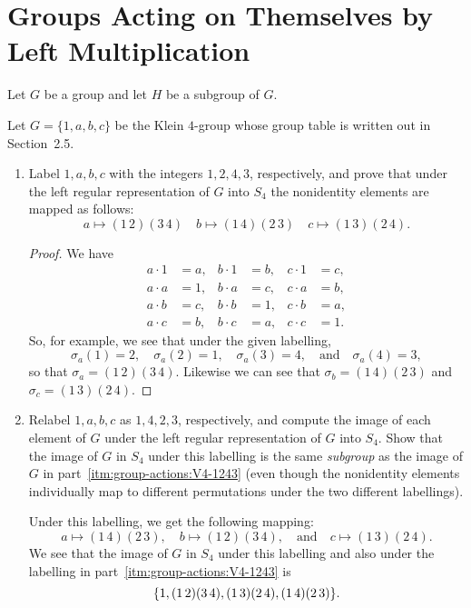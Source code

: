\section{Groups Acting on Themselves by Left Multiplication}

Let $G$ be a group and let $H$ be a subgroup of $G$.

 Let $G = \{1,a,b,c\}$ be the Klein $4$-group whose group
table is written out in Section~2.5.
\begin{enumerate}
\item \label{itm:group-actions:V4-1243}
  Label $1,a,b,c$ with the integers $1,2,4,3$, respectively, and prove
  that under the left regular representation of $G$ into $S_4$ the
  nonidentity elements are mapped as follows:
  \begin{equation*}
    a\mapsto(1\,2)(3\,4) \quad
    b\mapsto(1\,4)(2\,3) \quad
    c\mapsto(1\,3)(2\,4).
  \end{equation*}
  \begin{proof}
    We have
    \begin{align*}
      a\cdot1 &= a, & b\cdot1 &= b, & c\cdot1 &= c, \\
      a\cdot a &= 1, & b\cdot a &= c, & c\cdot a &= b, \\
      a\cdot b &= c, & b\cdot b &= 1, & c\cdot b &= a, \\
      a\cdot c &= b, & b\cdot c &= a, & c\cdot c &= 1.
    \end{align*}
    So, for example, we see that under the given labelling,
    \begin{equation*}
      \sigma_a(1) = 2, \quad
      \sigma_a(2) = 1, \quad
      \sigma_a(3) = 4, \quad\text{and}\quad
      \sigma_a(4) = 3,
    \end{equation*}
    so that $\sigma_a = (1\,2)(3\,4)$. Likewise we can see that
    $\sigma_b = (1\,4)(2\,3)$ and $\sigma_c = (1\,3)(2\,4)$.
  \end{proof}

\item Relabel $1,a,b,c$ as $1,4,2,3$, respectively, and compute the
  image of each element of $G$ under the left regular representation
  of $G$ into $S_4$. Show that the image of $G$ in $S_4$ under this
  labelling is the same {\em subgroup} as the image of $G$ in
  part~\ref{itm:group-actions:V4-1243} (even though the nonidentity
  elements individually map to different permutations under the two
  different labellings).
  \begin{solution}
    Under this labelling, we get the following mapping:
    \begin{equation*}
      a \mapsto (1\,4)(2\,3), \quad
      b \mapsto (1\,2)(3\,4), \quad\text{and}\quad
      c \mapsto (1\,3)(2\,4).
    \end{equation*}
    We see that the image of $G$ in $S_4$ under this labelling and
    also under the labelling in part~\ref{itm:group-actions:V4-1243}
    is
    \begin{equation*}
      \{1, (1\,2)(3\,4), (1\,3)(2\,4), (1\,4)(2\,3)\}. \qedhere
    \end{equation*}
  \end{solution}
\end{enumerate}

